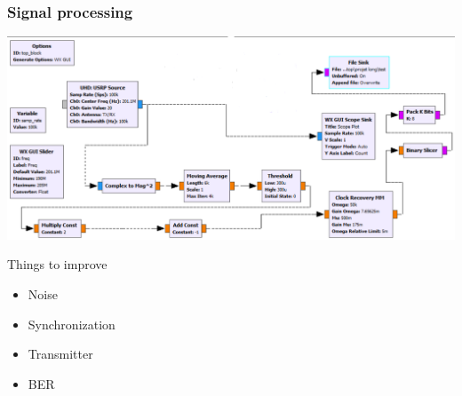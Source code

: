 \begin{frame}
	\frametitle{Signal processing}
	\centering \includegraphics[scale=.35]{images/flaw.png}
	\begin{block}{Things to improve}
		\begin{itemize}
			\item Noise
			\item Synchronization
			\item Transmitter
			\item BER
		\end{itemize}
	\end{block}
\end{frame}
